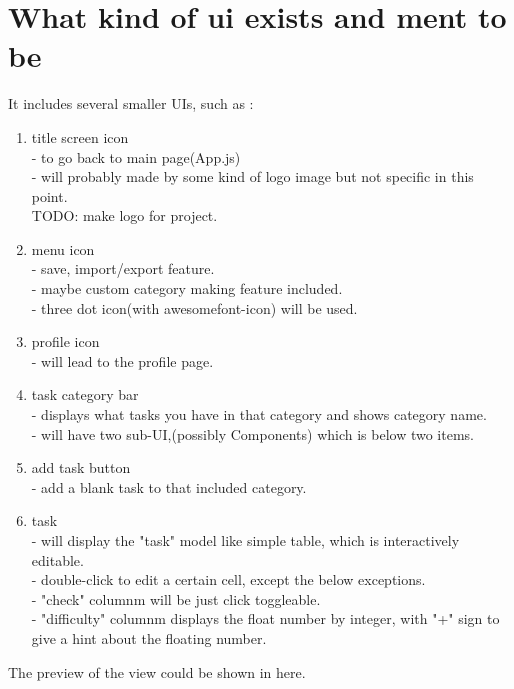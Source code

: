 \documentclass{article}
\begin{document}
    \section{What kind of ui exists and ment to be}
    It includes several smaller UIs, such as :
    \begin{enumerate}
        \item title screen icon\\
        - to go back to main page(App.js)\\
        - will probably made by some kind of logo image but not specific in this point.\\
        TODO: make logo for project.
        \item menu icon\\
        - save, import/export feature.\\
        - maybe custom category making feature included.\\
        - three dot icon(with awesomefont-icon) will be used.
        \item profile icon\\
        - will lead to the profile page.
        \item task category bar\\
        - displays what tasks you have in that category and shows category name.\\
        - will have two sub-UI,(possibly Components) which is below two items.
        \item add task button\\
        - add a blank task to that included category.
        \item task\\
        - will display the "task" model like simple table, which is interactively editable.\\
        - double-click to edit a certain cell, except the below exceptions.\\
        - "check" columnm will be just click toggleable.\\
        - "difficulty" columnm displays the float number by integer, with "+" sign to give a hint about the floating number.
    \end{enumerate}

    The preview of the view could be shown in here.
\end{document}
